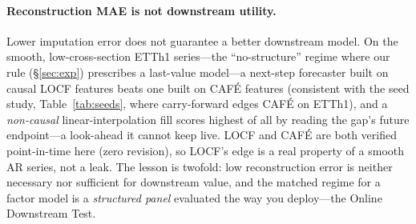 \documentclass[10pt,twocolumn]{article}
\newcommand{\cafe}{CAF\'E}
\begin{document}
\paragraph{Reconstruction MAE is not downstream utility.} Lower imputation error
does not guarantee a better downstream model. On the smooth, low-cross-section
ETTh1 series---the ``no-structure'' regime where our rule (\S\ref{sec:exp})
prescribes a last-value model---a next-step forecaster built on causal LOCF
features beats one built on \cafe{} features (consistent with the seed study,
Table~\ref{tab:seeds}, where carry-forward edges \cafe{} on ETTh1), and a
\emph{non-causal} linear-interpolation fill scores highest of all by reading the
gap's future endpoint---a look-ahead it cannot keep live. LOCF and \cafe{} are both
verified point-in-time here (zero revision), so LOCF's edge is a real property of a
smooth AR series, not a leak. The lesson is twofold: low reconstruction error is
neither necessary nor sufficient for downstream value, and the matched regime for a
factor model is a \emph{structured panel} evaluated the way you deploy---the Online
Downstream Test.
\end{document}
